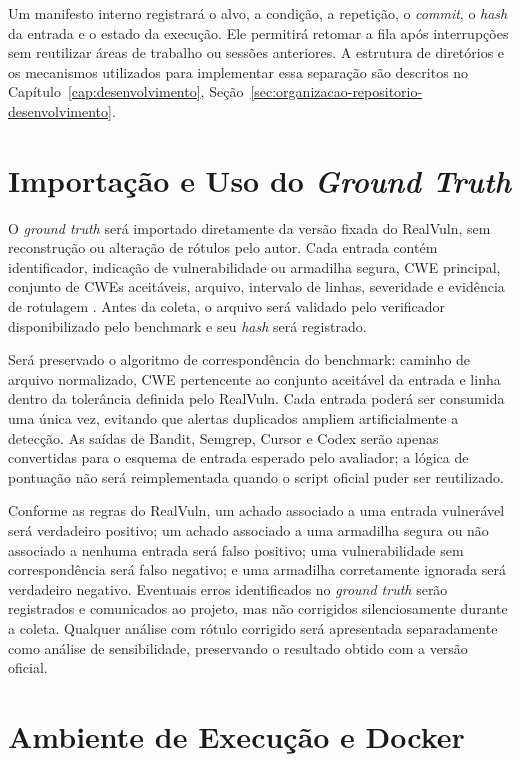 Um manifesto interno registrará o alvo, a condição, a repetição, o \textit{commit}, o \textit{hash} da entrada e o estado da execução. Ele permitirá retomar a fila após interrupções sem reutilizar áreas de trabalho ou sessões anteriores. A estrutura de diretórios e os mecanismos utilizados para implementar essa separação são descritos no Capítulo~\ref{cap:desenvolvimento}, Seção~\ref{sec:organizacao-repositorio-desenvolvimento}.

\section{Importação e Uso do \textit{Ground Truth}}\label{sec:ground-truth-metodologia}

O \textit{ground truth} será importado diretamente da versão fixada do RealVuln, sem reconstrução ou alteração de rótulos pelo autor. Cada entrada contém identificador, indicação de vulnerabilidade ou armadilha segura, CWE principal, conjunto de CWEs aceitáveis, arquivo, intervalo de linhas, severidade e evidência de rotulagem \cite{Pellew2026RealVuln}. Antes da coleta, o arquivo será validado pelo verificador disponibilizado pelo benchmark e seu \textit{hash} será registrado.

Será preservado o algoritmo de correspondência do benchmark: caminho de arquivo normalizado, CWE pertencente ao conjunto aceitável da entrada e linha dentro da tolerância definida pelo RealVuln. Cada entrada poderá ser consumida uma única vez, evitando que alertas duplicados ampliem artificialmente a detecção. As saídas de Bandit, Semgrep, Cursor e Codex serão apenas convertidas para o esquema de entrada esperado pelo avaliador; a lógica de pontuação não será reimplementada quando o script oficial puder ser reutilizado.

Conforme as regras do RealVuln, um achado associado a uma entrada vulnerável será verdadeiro positivo; um achado associado a uma armadilha segura ou não associado a nenhuma entrada será falso positivo; uma vulnerabilidade sem correspondência será falso negativo; e uma armadilha corretamente ignorada será verdadeiro negativo. Eventuais erros identificados no \textit{ground truth} serão registrados e comunicados ao projeto, mas não corrigidos silenciosamente durante a coleta. Qualquer análise com rótulo corrigido será apresentada separadamente como análise de sensibilidade, preservando o resultado obtido com a versão oficial.

\section{Ambiente de Execução e Docker}\label{sec:materiais-ambiente}

